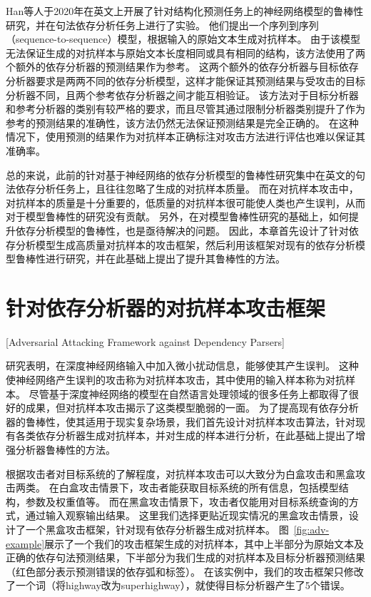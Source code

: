 Han等人\cite{han-etal-2020-adversarial}于2020年在英文上开展了针对结构化预测任务上的神经网络模型的鲁棒性研究，并在句法依存分析任务上进行了实验。
他们提出一个序列到序列（sequence-to-sequence）模型，根据输入的原始文本生成对抗样本。
由于该模型无法保证生成的对抗样本与原始文本长度相同或具有相同的结构，该方法使用了两个额外的依存分析器的预测结果作为参考。
这两个额外的依存分析器与目标依存分析器要求是两两不同的依存分析模型，这样才能保证其预测结果与受攻击的目标分析器不同，且两个参考依存分析器之间才能互相验证。
该方法对于目标分析器和参考分析器的类别有较严格的要求，而且尽管其通过限制分析器类别提升了作为参考的预测结果的准确性，该方法仍然无法保证预测结果是完全正确的。
在这种情况下，使用预测的结果作为对抗样本正确标注对攻击方法进行评估也难以保证其准确率。

总的来说，此前的针对基于神经网络的依存分析模型的鲁棒性研究集中在英文的句法依存分析任务上，且往往忽略了生成的对抗样本质量。
而在对抗样本攻击中，对抗样本的质量是十分重要的，低质量的对抗样本很可能使人类也产生误判，从而对于模型鲁棒性的研究没有贡献。
另外，在对模型鲁棒性研究的基础上，如何提升依存分析模型的鲁棒性，也是亟待解决的问题。
因此，本章首先设计了针对依存分析模型生成高质量对抗样本的攻击框架，然后利用该框架对现有的依存分析模型鲁棒性进行研究，并在此基础上提出了提升其鲁棒性的方法。

\section{针对依存分析器的对抗样本攻击框架}[Adversarial Attacking Framework against Dependency Parsers]

研究表明，在深度神经网络输入中加入微小扰动信息，能够使其产生误判。
这种使神经网络产生误判的攻击称为对抗样本攻击，其中使用的输入样本称为对抗样本。
尽管基于深度神经网络的模型在自然语言处理领域的很多任务上都取得了很好的成果，但对抗样本攻击揭示了这类模型脆弱的一面。
为了提高现有依存分析器的鲁棒性，使其适用于现实复杂场景，我们首先设计对抗样本攻击算法，针对现有各类依存分析器生成对抗样本，并对生成的样本进行分析，在此基础上提出了增强分析器鲁棒性的方法。

根据攻击者对目标系统的了解程度，对抗样本攻击可以大致分为白盒攻击和黑盒攻击两类。
在白盒攻击情景下，攻击者能获取目标系统的所有信息，包括模型结构，参数及权重值等。
而在黑盒攻击情景下，攻击者仅能用对目标系统查询的方式，通过输入观察输出结果。
这里我们选择更贴近现实情况的黑盒攻击情景，设计了一个黑盒攻击框架，针对现有依存分析器生成对抗样本。
图~\ref{fig:adv-example}展示了一个我们的攻击框架生成的对抗样本，其中上半部分为原始文本及正确的依存句法预测结果，下半部分为我们生成的对抗样本及目标分析器预测结果（红色部分表示预测错误的依存弧和标签）。
在该实例中，我们的攻击框架只修改了一个词（将highway改为superhighway），就使得目标分析器产生了5个错误。

